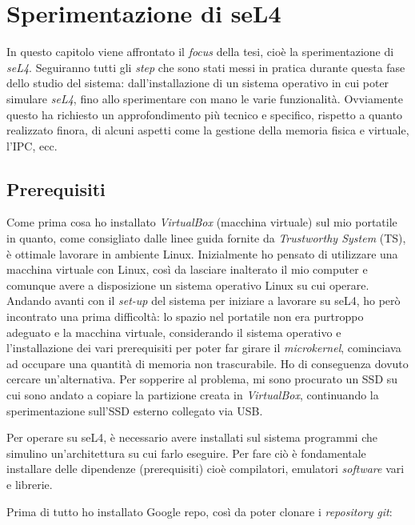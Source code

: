 \chapter{Sperimentazione di seL4}
In questo capitolo viene affrontato il \textit{focus} della tesi, cioè la sperimentazione di \textit{seL4}. Seguiranno tutti gli \textit{step} che sono stati messi in pratica durante questa fase dello studio del sistema: dall'installazione di un sistema operativo in cui poter simulare \textit{seL4}, fino allo sperimentare con mano le varie funzionalità. Ovviamente questo ha richiesto un approfondimento più tecnico e specifico, rispetto a quanto realizzato finora, di alcuni aspetti come la gestione della memoria fisica e virtuale, l'IPC, ecc.

\section{Prerequisiti}
Come prima cosa ho installato \textit{VirtualBox} (macchina virtuale) sul mio portatile in quanto, come consigliato dalle linee guida fornite da \textit{Trustworthy System} (TS), è ottimale lavorare in ambiente Linux. Inizialmente ho pensato di utilizzare una macchina virtuale con Linux, così da lasciare inalterato il mio computer e comunque avere a disposizione un sistema operativo Linux su cui operare. Andando avanti con il \textit{set-up} del sistema per iniziare a lavorare su seL4, ho però incontrato una prima difficoltà: lo spazio nel portatile non era purtroppo adeguato e la macchina virtuale, considerando il sistema operativo e l'installazione dei vari prerequisiti per poter far girare il \textit{microkernel}, cominciava ad occupare una quantità di memoria non trascurabile. Ho di conseguenza dovuto cercare un'alternativa. Per sopperire al problema, mi sono procurato un SSD su cui sono andato a copiare la partizione creata in \textit{VirtualBox}, continuando la sperimentazione sull'SSD esterno collegato via USB.

Per operare su seL4, è necessario avere installati sul sistema programmi che simulino un'architettura su cui farlo eseguire. Per fare ciò è fondamentale installare delle dipendenze (prerequisiti) cioè compilatori, emulatori \textit{software} vari e librerie.

Prima di tutto ho installato Google repo, così da poter clonare i \textit{repository git}:

